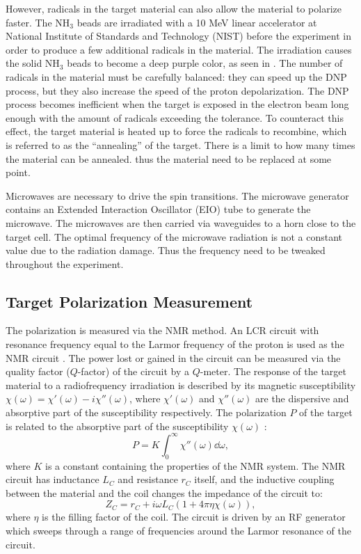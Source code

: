 However, radicals in the target material can also allow the material to polarize faster. The NH${}_3$ beads are irradiated with a 10 MeV linear accelerator at National Institute of Standards and Technology (NIST) before the experiment in order to produce a few additional radicals in the material. The irradiation causes the solid NH${}_3$ beads to become a deep purple color, as seen in . The number of radicals in the material must be carefully balanced: they can speed up the DNP process, but they also increase the speed of the proton depolarization. The DNP process becomes inefficient when the target is exposed in the electron beam long enough with the amount of radicals exceeding the tolerance. To counteract this effect, the target material is heated up to force the radicals to recombine, which is referred to as the ``annealing'' of the target. There is a limit to how many times the material can be annealed. thus the material need to be replaced at some point.

Microwaves are necessary to drive the spin transitions. The microwave generator contains an Extended Interaction Oscillator (EIO) tube to generate the microwave. The microwaves are then carried via waveguides to a horn close to the target cell. The optimal frequency of the microwave radiation is not a constant value due to the radiation damage. Thus the frequency need to be tweaked throughout the experiment.

\subsection{Target Polarization Measurement}
\label{C5S3SS3}

The polarization is measured via the NMR method. An LCR circuit with resonance frequency equal to the Larmor frequency of the proton is used as the NMR circuit \cite{Crabb1997}. The power lost or gained in the circuit can be measured via the quality factor ($Q$-factor) of the circuit by a $Q$-meter. The response of the target material to a radiofrequency irradiation is described by its magnetic susceptibility $\chi(\omega)=\chi'(\omega)-i\chi''(\omega)$, where $\chi'(\omega)$ and $\chi''(\omega)$ are the dispersive and absorptive part of the susceptibility respectively. The polarization $P$ of the target is related to the absorptive part of the susceptibility $\chi(\omega)$ \cite{Goldman1975}:
\begin{equation} \label{C5S3SS3E1}
P = K\int_0^\infty\chi''(\omega)\dd{\omega},
\end{equation}
where $K$ is a constant containing the properties of the NMR system. The NMR circuit has inductance $L_C$ and resistance $r_C$ itself, and the inductive coupling between the material and the coil changes the impedance of the circuit to:
\begin{equation} \label{C5S3SS3E2}
Z_C = r_C+i\omega L_C(1+4\pi\eta\chi(\omega)),
\end{equation}
where $\eta$ is the filling factor of the coil. The circuit is driven by an RF generator which sweeps through a range of frequencies around the Larmor resonance of the circuit.


